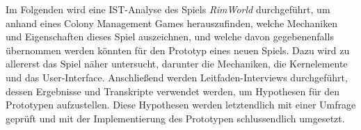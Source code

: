 Im Folgenden wird eine IST-Analyse des Spiels \textit{RimWorld} durchgeführt, um anhand eines Colony Management Games herauszufinden, welche Mechaniken und Eigenschaften dieses Spiel auszeichnen, und welche davon gegebenenfalls übernommen werden könnten für den Prototyp eines neuen Spiels. Dazu wird zu allererst das Spiel näher untersucht, darunter die Mechaniken, die Kernelemente und das User-Interface. Anschließend werden Leitfaden-Interviews durchgeführt, dessen Ergebnisse und Transkripte verwendet werden, um Hypothesen für den Prototypen aufzustellen. Diese Hypothesen werden letztendlich mit einer Umfrage geprüft und mit der Implementierung des Prototypen schlussendlich umgesetzt. 



